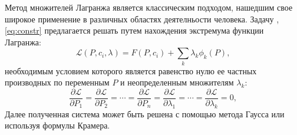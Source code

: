 %

Метод множителей Лагранжа является классическим подходом, нашедшим свое широкое применение в различных областях деятелньости человека. Задачу \label{track_fit}, \eqref{eq:constr} предлагается решать путем нахождения экстремума функции Лагранжа:
\begin{equation}
 \label{lagr}
 \mathcal{L}(P, c_i, \lambda) = F(P, c_i) + \sum_k \lambda_k \phi_k(P),
\end{equation}
необходимым условием которого является равенство нулю ее частных производных по переменным $P$ и неопределенным множителям $\lambda_k$:
\[\frac{\partial \mathcal{L}}{\partial P_1} = \frac{\partial \mathcal{L}}{\partial P_2} = \cdots = \frac{\partial \mathcal{L}}{\partial P_n} = \frac{\partial \mathcal{L}}{\partial \lambda_1} = \cdots = \frac{\partial \mathcal{L}}{\partial \lambda_k} = 0,\]
Далее полученная система может быть решена с помощью метода Гаусса или используя формулы Крамера.

